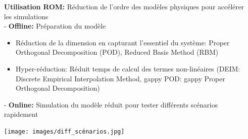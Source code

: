 \documentclass{beamer}
\begin{document}
\begin{frame}
    \small
    \textbf{Utilisation ROM:} Réduction de l'ordre des modèles physiques pour accélérer les simulations  \\
    \vspace{0.2cm}
    - \textbf{Offline:} Préparation du modèle
    \begin{itemize}
        \item Réduction de la dimension en capturant l'essentiel du système: Proper Orthogonal Decomposition (POD), Reduced Basis Method (RBM)
        \item Hyper-réduction: Réduit temps de calcul des termes non-linéaires (DEIM: Discrete Empirical Interpolation Method, gappy POD: gappy Proper Orthogonal Decomposition) %
    \end{itemize}
    \vspace{0.2cm}
    - \textbf{Online:} Simulation du modèle réduit pour tester différents scénarios rapidement
    \vspace{-0.4cm}
    \begin{flushright}
        \texttt{[image: images/diff\_scénarios.jpg]}
    \end{flushright}
\end{frame}
\end{document}
